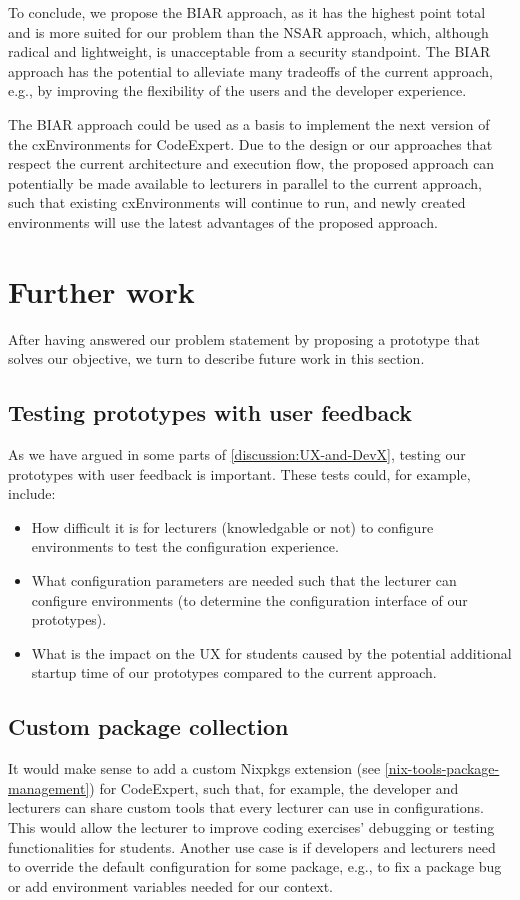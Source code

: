 To conclude, we propose the BIAR approach, as it has the highest point total and is more suited for our problem than the NSAR approach, which, although radical and lightweight, is unacceptable from a security standpoint. The BIAR approach has the potential to alleviate many tradeoffs of the current approach, e.g., by improving the flexibility of the users and the developer experience.

The BIAR approach could be used as a basis to implement the next version of the cxEnvironments for CodeExpert. Due to the design or our approaches that respect the current architecture and execution flow, the proposed approach can potentially be made available to lecturers in parallel to the current approach, such that existing cxEnvironments will continue to run, and newly created environments will use the latest advantages of the proposed approach.

\section{Further work}
After having answered our problem statement by proposing a prototype that solves our objective, we turn to describe future work in this section.

\subsection{Testing prototypes with user feedback}
As we have argued in some parts of \ref{discussion:UX-and-DevX}, testing our prototypes with user feedback is important. These tests could, for example, include:
\begin{itemize}
    \item How difficult it is for lecturers (knowledgable or not) to configure environments to test the configuration experience.
    \item What configuration parameters are needed such that the lecturer can configure environments (to determine the configuration interface of our prototypes).
    \item What is the impact on the UX for students caused by the potential additional startup time of our prototypes compared to the current approach.
\end{itemize}

\subsection{Custom package collection}\label{custom-package-collection}
It would make sense to add a custom Nixpkgs extension (see \ref{nix-tools-package-management}) for CodeExpert, such that, for example, the developer and lecturers can share custom tools that every lecturer can use in configurations. This would allow the lecturer to improve coding exercises' debugging or testing functionalities for students. Another use case is if developers and lecturers need to override the default configuration for some package, e.g., to fix a package bug or add environment variables needed for our context. 

